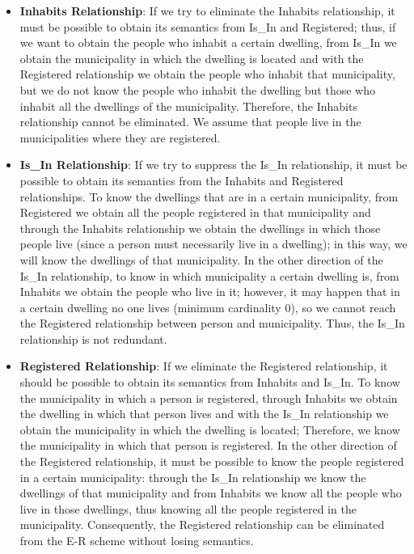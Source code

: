 \documentclass{article}
\numberwithin{figure}{section}
\begin{document}
\begin{itemize}
    \item \textbf{Inhabits Relationship}: If we try to eliminate the Inhabits relationship, it must be possible to obtain its semantics from Is\_In and Registered; thus, if we want to obtain the people who inhabit a certain dwelling, from Is\_In we obtain the municipality in which the dwelling is located and with the Registered relationship we obtain the people who inhabit that municipality, but we do not know the people who inhabit the dwelling but those who inhabit all the dwellings of the municipality.  Therefore, the Inhabits relationship cannot be eliminated.  We assume that people live in the municipalities where they are registered.

    \item \textbf{Is\_In Relationship}: If we try to suppress the Is\_In relationship, it must be possible to obtain its semantics from the Inhabits and Registered relationships.  To know the dwellings that are in a certain municipality, from Registered we obtain all the people registered in that municipality and through the Inhabits relationship we obtain the dwellings in which those people live (since a person must necessarily live in a dwelling); in this way, we will know the dwellings of that municipality.  In the other direction of the Is\_In relationship, to know in which municipality a certain dwelling is, from Inhabits we obtain the people who live in it; however, it may happen that in a certain dwelling no one lives (minimum cardinality 0), so we cannot reach the Registered relationship between person and municipality.  Thus, the Is\_In relationship is not redundant.

    \item \textbf{Registered Relationship}: If we eliminate the Registered relationship, it should be possible to obtain its semantics from Inhabits and Is\_In.  To know the municipality in which a person is registered, through Inhabits we obtain the dwelling in which that person lives and with the Is\_In relationship we obtain the municipality in which the dwelling is located; Therefore, we know the municipality in which that person is registered.  In the other direction of the Registered relationship, it must be possible to know the people registered in a certain municipality: through the Is\_In relationship we know the dwellings of that municipality and from Inhabits we know all the people who live in those dwellings, thus knowing all the people registered in the municipality.  Consequently, the Registered relationship can be eliminated from the E-R scheme without losing semantics.
\end{itemize}
\end{document}
